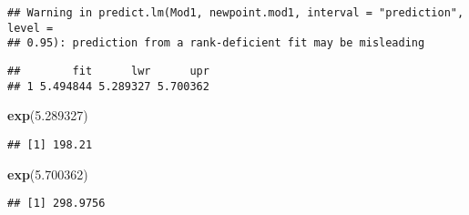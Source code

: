 \documentclass[
]{article}
\newenvironment{Shaded}{\begin{snugshade}}{\end{snugshade}}
\newcommand{\FloatTok}[1]{\textcolor[rgb]{0.00,0.00,0.81}{#1}}
\newcommand{\KeywordTok}[1]{\textcolor[rgb]{0.13,0.29,0.53}{\textbf{#1}}}
\newcommand{\NormalTok}[1]{#1}
\begin{document}
\begin{verbatim}
## Warning in predict.lm(Mod1, newpoint.mod1, interval = "prediction", level =
## 0.95): prediction from a rank-deficient fit may be misleading
\end{verbatim}

\begin{verbatim}
##        fit      lwr      upr
## 1 5.494844 5.289327 5.700362
\end{verbatim}

\begin{Shaded}
\begin{Highlighting}[]
\KeywordTok{exp}\NormalTok{(}\FloatTok{5.289327}\NormalTok{)}
\end{Highlighting}
\end{Shaded}

\begin{verbatim}
## [1] 198.21
\end{verbatim}

\begin{Shaded}
\begin{Highlighting}[]
\KeywordTok{exp}\NormalTok{(}\FloatTok{5.700362}\NormalTok{)}
\end{Highlighting}
\end{Shaded}

\begin{verbatim}
## [1] 298.9756
\end{verbatim}
\end{document}
